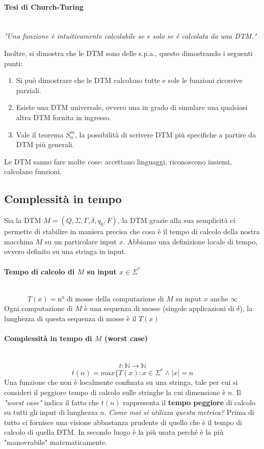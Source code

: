 \documentclass{article}
\begin{document}
\paragraph{Tesi di Church-Turing}\mbox{}\\
\textit{"Una funzione è intuitivamente calcolabile se e solo se è calcolata
da una DTM."}

Inoltre, si dimostra che le DTM sono delle s.p.a., questo dimostrando
i seguenti punti:
\begin{enumerate}
    \item Si può dimostrare che le DTM calcolano tutte e sole le funzioni ricorsive
    parziali.
    \item Esiste una DTM universale, ovvero una in grado di simulare una qualsiasi
    altra DTM fornita in ingresso.
    \item Vale il teorema $S_n^m$, la possibilità di scrivere DTM più specifiche
    a partire da DTM più generali.
\end{enumerate}
Le DTM sanno fare molte cose: accettano linguaggi, riconoscono insiemi,
calcolano funzioni.

\subsection{Complessità in tempo}
Sia la DTM $M=(Q,\Sigma,\Gamma,\delta,q_0,F)$, la DTM grazie alla sua semplicità
ci permette di stabilire in maniera precisa che cosa è il tempo di calcolo
della nostra macchina $M$ su un particolare input $x$. Abbiamo una definizione
locale di tempo, ovvero definito su una stringa in input.

\paragraph{Tempo di calcolo di $M$ su input $x\in\Sigma^*$}\mbox{}\\
$$T(x)=\text{n° di mosse della computazione di }M\text{ su input }x\text{ anche }\infty$$
Ogni computazione di $M$ è una sequenza di mosse (singole
applicazioni di $\delta$), la lunghezza di questa
sequenza di mosse è il $T(x)$

\paragraph{Complessità in tempo di $M$ (worst case)}\mbox{}\\
$$t:\mathbb{N}\rightarrow\mathbb{N}$$
$$t(n)=max\{T(x):x\in\Sigma^*\land|x|=n$$
Una funzione che non è localmente confinata su una stringa, tale per cui
si consideri il peggiore tempo di calcolo sulle stringhe la cui dimensione
è $n$. Il \textit{"worst case"} indica il fatto che $t(n)$ rappresenta il
\textbf{tempo peggiore} di calcolo su tutti gli input di lunghezza $n$.
\textit{Come mai si utilizza questa metrica?} Prima di tutto ci fornisce
una visione abbastanza prudente di quello che è il tempo di calcolo
di quella DTM. In secondo luogo è la più usata perché è la più
"manovrabile" matematicamente.
\end{document}
